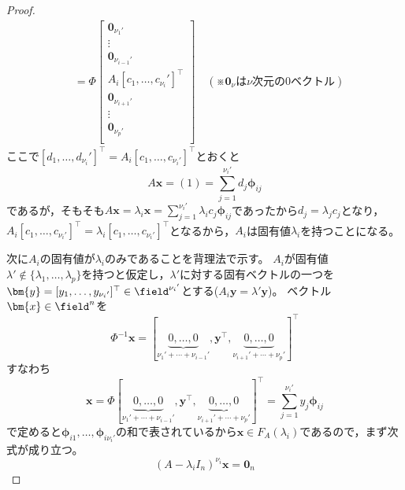 \begin{proof}
\begin{align}
                    &= \Phi\left[
                            \begin{array}{c}
                                \bm{0}_{{\nu_1}'}\\
                                \vdots\\
                                \bm{0}_{{\nu_{i-1}}'}\\
                                A_i[c_1,\dotsc,c_{{\nu_i}}']^\top\\
                                \bm{0}_{{\nu_{i+1}}'}\\
                                \vdots\\
                                \bm{0}_{{\nu_p}'}\\
                            \end{array}
                        \right]\quad (\mathrm{※}\bm{0}_\nu\mathrm{は}\nu\mathrm{次元の0ベクトル})
                \end{align}
                ここで$[d_1,\dotsc,d_{\nu_i}']^\top = A_i[c_1,\dotsc,c_{{\nu_i}'}]^\top$とおくと
                \[A\bm{x} = (1) = \sum_{j=1}^{{\nu_i}'}{d_j\bm{\phi}_{ij}}\]
                であるが，そもそも$A\bm{x} = \lambda_i\bm{x} = \sum_{j=1}^{{\nu_i}'}{\lambda_ic_j\bm{\phi}_{ij}}$であったから$d_j = \lambda_jc_j$となり，
                $A_i[c_1,\dotsc,c_{{\nu_i}'}]^\top = \lambda_i[c_1,\dotsc,c_{{\nu_i}'}]^\top$となるから，$A_i$は固有値$\lambda_i$を持つことになる。
                \par
                次に$A_i$の固有値が$\lambda_i$のみであることを背理法で示す。
                $A_i$が固有値$\lambda'\notin\{\lambda_1,\dotsc,\lambda_p\}$を持つと仮定し，$\lambda'$に対する固有ベクトルの一つを$\bm{y} = [y_1,\dotsc,y_{{\nu_i}'}]^\top\in\field^{{\nu_i}'}$とする($A_i\bm{y}=\lambda'\bm{y}$)。
                ベクトル$\bm{x}\in\field^n$を
                \[\Phi^{-1}\bm{x} = [\underbrace{0,\dotsc,0}_{{\nu_1}'+\dotsb+{\nu_{i-1}}'},\bm{y}^\top,\underbrace{0,\dotsc,0}_{{\nu_{i+1}}'+\dotsb+{\nu_p}'}]^\top\]
                すなわち
                \[\bm{x} = \Phi[\underbrace{0,\dotsc,0}_{{\nu_1}'+\dotsb+{\nu_{i-1}}'},\bm{y}^\top,\underbrace{0,\dotsc,0}_{{\nu_{i+1}}'+\dotsb+{\nu_p}'}]^\top = \sum_{j=1}^{{\nu_i}'}{y_j\bm{\phi}_{ij}}\]
                で定めると$\bm{\phi}_{i1},\dotsc,\bm{\phi}_{i{\nu_i}'}$の和で表されているから$\bm{x}\in F_A(\lambda_i)$であるので，まず次式が成り立つ。
                \begin{equation}
                    (A-\lambda_iI_n)^{\nu_i}\bm{x} = \bm{0}_n
                \end{equation}

\end{proof}
